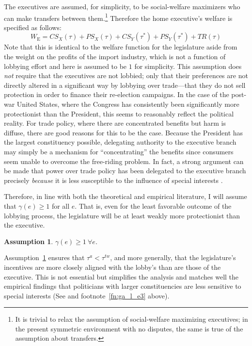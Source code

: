 \documentclass[authoryear, review]{elsarticle}
\newtheorem{assumption}{Assumption}
\newcommand{\ga}{\gamma}
\begin{document}
The executives are assumed, for simplicity, to be social-welfare maximizers who can make transfers between them.\footnote{It is trivial to relax the assumption of social-welfare maximizing executives; in the present symmetric environment with no disputes, the same is true of the assumption about transfers.} Therefore the home executive's welfare is specified as follows:
\[
  W_\text{E} = \mathit{CS}_X(\tau) + \mathit{PS}_X(\tau) + \mathit{CS}_Y(\tau^*) + \mathit{PS}_Y(\tau^*) + \mathit{TR}(\tau)
\]
Note that this is identical to the welfare function for the legislature aside from the weight on the profits of the import industry, which is not a function of lobbying effort and here is assumed to be $1$ for simplicity. This assumption does \textit{not} require that the executives are not lobbied; only that their preferences are not directly altered in a significant way by lobbying over trade---that they do not sell protection in order to finance their re-election campaigns. In the case of the post-war United States, where the Congress has consistently been significantly more protectionist than the President, this seems to reasonably reflect the political reality. For trade policy, where there are concentrated benefits but harm is diffuse, there are good reasons for this to be the case. Because the President has the largest constituency possible, delegating authority to the executive branch may simply be a mechanism for ``concentrating'' the benefits since consumers seem unable to overcome the free-riding problem. In fact, a strong argument can be made that power over trade policy has been delegated to the executive branch precisely \textit{because} it is less susceptible to the influence of special interests \citet{destler}.

Therefore, in line with both the theoretical and empirical literature, I will assume that $\ga(e) \geq 1$ for all $e$. That is, even for the least favorable outcome of the lobbying process, the legislature will be at least weakly more protectionist than the executive. 

\begin{assumption}
  $\ga(e) \geq 1 \ \forall e$.
  \label{as:ga_l_e3}
\end{assumption}

Assumption~\ref{as:ga_l_e3} ensures that $\tau^a < \tau^{tw}$, and more generally, that the legislature's incentives are more closely aligned with the lobby's than are those of the executive. This is not essential but simplifies the analysis and matches well the empirical findings that politicians with larger constituencies are less sensitive to special interests (See \citet{destler} and footnote~\ref{fn:ga_l_e3} above).
\end{document}
